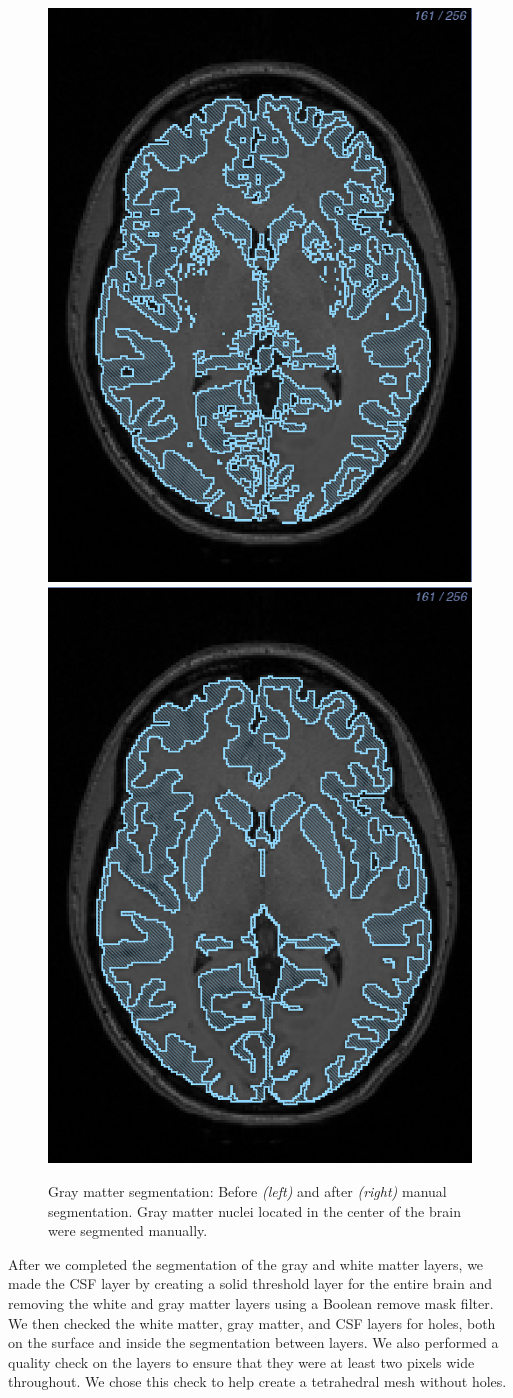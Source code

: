 \begin{figure}[H]
\begin{center}
\includegraphics[width=.49\textwidth]{Figures/greymatter_before_nuclei}
\includegraphics[width=.49\textwidth]{Figures/greymatter_added_nuclei}
\caption{Gray matter segmentation: Before \textit{(left)} and after \textit{(right)} manual segmentation. Gray matter nuclei located in the center of the brain were segmented manually.}
\label{fig:gm}
\end{center}
\end{figure}

After we completed the segmentation of the gray and white matter layers, we made the CSF layer by creating a solid threshold layer for the entire brain and removing the white and gray matter layers using a Boolean remove mask filter. We then checked the white matter, gray matter, and CSF layers for holes, both on the surface and inside the segmentation between layers. We also performed a quality check on the layers to ensure that they were at least two pixels wide throughout. We chose this check to help create a tetrahedral mesh without holes.

